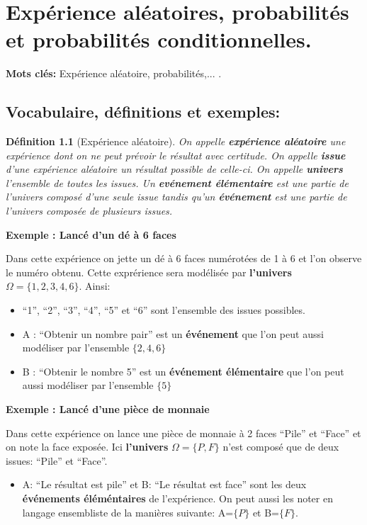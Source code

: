 \documentclass[a4paper]{report}
\theoremstyle{break}
\newtheorem{mydef}{Définition}[chapter]
\newcounter{exem}
\newcommand{\exemple}[1]{\textbf{Exemple \theexem: #1} \addtocounter{exem}{1} }
\begin{document}
\tableofcontents

\chapter{Expérience aléatoires, probabilités et probabilités conditionnelles.}

\textbf{Mots clés: } Expérience aléatoire, probabilités,... .

\section{Vocabulaire, définitions et exemples:}

\begin{mydef}[Expérience aléatoire]
  On appelle \textbf{expérience aléatoire} une expérience dont on ne peut
  prévoir le résultat avec certitude. On appelle \textbf{issue} d'une expérience
  aléatoire un résultat possible de celle-ci. On appelle \textbf{univers}
  l'ensemble de toutes les issues. Un \textbf{evénement élémentaire} est une
  partie de l'univers composé d'une seule issue tandis qu'un \textbf{événement}
  est une partie de l'univers composée de plusieurs issues. 
\end{mydef}

\exemple{Lancé d'un dé à 6 faces}

Dans cette expérience on jette un dé à 6 faces numérotées de 1 à 6 et l'on
observe le numéro obtenu. Cette exprérience sera modélisée par
\textbf{l'univers} $\Omega=\{1,2,3,4,6\}$. Ainsi:
\begin{itemize}[label = $\bullet$, leftmargin=1cm]
\item ``1'', ``2'', ``3'', ``4'', ``5'' et ``6'' sont l'ensemble des issues
  possibles.
\item A : ``Obtenir un nombre pair'' est un \textbf{événement} que l'on peut
  aussi modéliser par l'ensemble $\{2,4,6\}$
\item B : ``Obtenir le nombre 5'' est un \textbf{événement élémentaire} que l'on
  peut aussi modéliser par l'ensemble $\{5\}$
\end{itemize}

\exemple{Lancé d'une pièce de monnaie}

Dans cette expérience on lance une pièce de monnaie à 2 faces ``Pile'' et
``Face'' et on note la face exposée. Ici \textbf{l'univers} $\Omega=\{P,F\}$
n'est composé que de deux issues: ``Pile'' et ``Face''.
\begin{itemize}[label = $\bullet$, leftmargin=1cm]
\item A: ``Le résultat est pile'' et B: ``Le résultat est face'' sont les deux
  \textbf{événements éléméntaires} de l'expérience. On peut aussi les noter en
  langage ensembliste de la manières suivante: A=$\{P\}$ et B=$\{F\}$.
\end{itemize}
\end{document}
